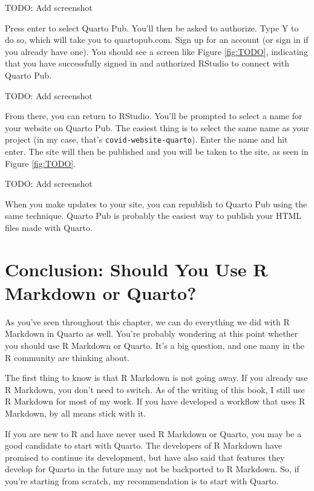 \documentclass[
]{book}
\begin{document}
TODO: Add screenshot

Press enter to select Quarto Pub. You'll then be asked to authorize. Type Y to do so, which will take you to quartopub.com. Sign up for an account (or sign in if you already have one). You should see a screen like Figure \ref{fig:TODO}, indicating that you have successfully signed in and authorized RStudio to connect with Quarto Pub.

TODO: Add screenshot

From there, you can return to RStudio. You'll be prompted to select a name for your website on Quarto Pub. The easiest thing is to select the same name as your project (in my case, that's \texttt{covid-website-quarto}). Enter the name and hit enter. The site will then be published and you will be taken to the site, as seen in Figure \ref{fig:TODO}.

TODO: Add screenshot

When you make updates to your site, you can republish to Quarto Pub using the same technique. Quarto Pub is probably the easiest way to publish your HTML files made with Quarto.

\hypertarget{conclusion-should-you-use-r-markdown-or-quarto}{%
\section*{Conclusion: Should You Use R Markdown or Quarto?}\label{conclusion-should-you-use-r-markdown-or-quarto}}

As you've seen throughout this chapter, we can do everything we did with R Markdown in Quarto as well. You're probably wondering at this point whether you should use R Markdown or Quarto. It's a big question, and one many in the R community are thinking about.

The first thing to know is that R Markdown is not going away. If you already use R Markdown, you don't need to switch. As of the writing of this book, I still use R Markdown for most of my work. If you have developed a workflow that uses R Markdown, by all means stick with it.

If you are new to R and have never used R Markdown or Quarto, you may be a good candidate to start with Quarto. The developers of R Markdown have promised to continue its development, but have also said that features they develop for Quarto in the future may not be backported to R Markdown. So, if you're starting from scratch, my recommendation is to start with Quarto.
\end{document}
